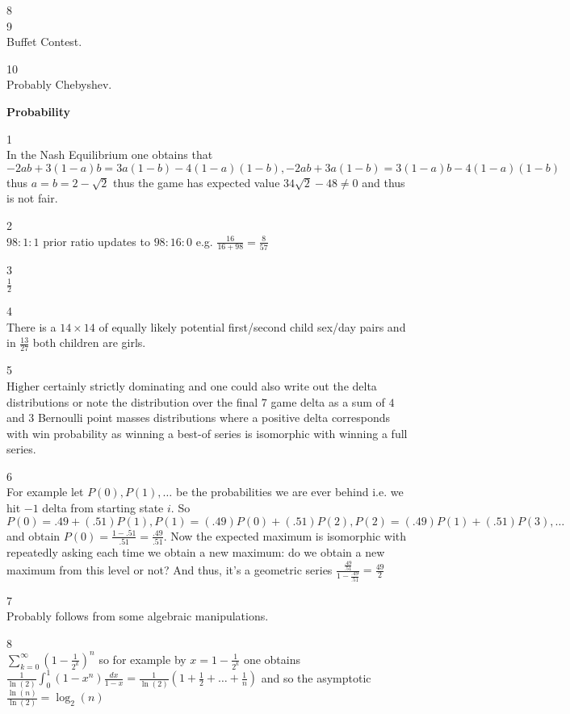 8 \\


9 \\
Buffet Contest.

10 \\
Probably Chebyshev.

\newpage

\textbf{Probability}

1 \\
In the Nash Equilibrium one obtains that $-2ab+3(1-a)b=3a(1-b)-4(1-a)(1-b),-2ab+3a(1-b)=3(1-a)b-4(1-a)(1-b)$ thus $a=b=2-\sqrt{2}$ thus the game has expected value $34\sqrt{2}-48 \neq 0$ and thus is not fair.

2 \\
$98:1:1$ prior ratio updates to $98:16:0$ e.g. $\frac{16}{16+98}=\boxed{\frac{8}{57}}$

3 \\
$\boxed{\frac{1}{2}}$

4 \\
There is a $14 \times 14$ of equally likely potential first/second child sex/day pairs and in $\boxed{\frac{13}{27}}$ both children are girls.

5 \\
$\text{Higher}$ certainly strictly dominating and one could also write out the delta distributions or note the distribution over the final $7$ game delta as a sum of $4$ and $3$ Bernoulli point masses distributions where a positive delta corresponds with win probability as winning a best-of series is isomorphic with winning a full series.

6 \\
For example let $P(0),P(1),\dots$ be the probabilities we are ever behind i.e. we hit $-1$ delta from starting state $i$. So $P(0)=.49+(.51)P(1), P(1)=(.49)P(0)+(.51)P(2), P(2)=(.49)P(1)+(.51)P(3), \dots$ and obtain $P(0)=\frac{1-.51}{.51}=\frac{.49}{.51}$. Now the expected maximum is isomorphic with repeatedly asking each time we obtain a new maximum: do we obtain a new maximum from this level or not? And thus, it's a geometric series $\frac{\frac{.49}{.51}}{1-\frac{.49}{.51}}=\frac{49}{2}$

7 \\
Probably follows from some algebraic manipulations.

8 \\
$\sum_{k=0}^{\infty} \left( 1-\frac{1}{2^k} \right)^n$ so for example by $x=1-\frac{1}{2^k}$ one obtains $\frac{1}{\ln(2)}\int_0^1 (1-x^n) \frac{dx}{1-x}=\frac{1}{\ln(2)}\left(1+\frac{1}{2}+\dots+\frac{1}{n}\right)$ and so the asymptotic $\frac{\ln(n)}{\ln(2)}=\boxed{\log_2 (n)}$

